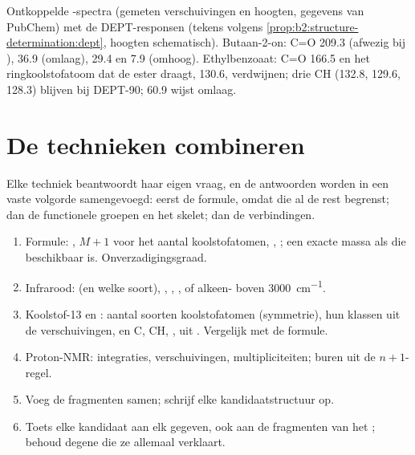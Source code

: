 \begin{omfigure}
{\small Ontkoppelde -spectra (gemeten verschuivingen en hoogten, gegevens van PubChem) met de
DEPT-responsen (tekens volgens \cref{prop:b2:structure-determination:dept}, hoogten schematisch). Butaan-2-on: C=O
209.3 (afwezig bij ),  36.9 (omlaag),  29.4 en 7.9 (omhoog). Ethylbenzoaat: C=O 166.5 en
het ringkoolstofatoom dat de ester draagt, 130.6, verdwijnen; drie  CH (132.8, 129.6, 128.3) blijven bij
DEPT-90;  60.9 wijst omlaag.}
\end{omfigure}

\section{De technieken combineren}

Elke techniek beantwoordt haar eigen vraag, en de antwoorden worden in een vaste volgorde samengevoegd: eerst de formule,
omdat die al de rest begrenst; dan de functionele groepen en het skelet; dan de
verbindingen.

\begin{method}\label{met:b2:structure-determination:solve}
\begin{enumerate}
  \item Formule: , $M+1$ voor het aantal koolstofatomen, , ; een
        exacte massa als die beschikbaar is. Onverzadigingsgraad.
  \item Infrarood:  (en welke soort), , , ,  of alkeen-
        boven \qty{3000}{cm^{-1}}.
  \item Koolstof-13 en : aantal soorten koolstofatomen (symmetrie), hun klassen uit de verschuivingen, en
        C, CH, ,  uit . Vergelijk met de formule.
  \item Proton-NMR: integraties, verschuivingen, multipliciteiten; buren uit de $n + 1$-regel.
  \item Voeg de fragmenten samen; schrijf elke kandidaatstructuur op.
  \item Toets elke kandidaat aan elk gegeven, ook aan de fragmenten van het ; behoud degene
        die ze allemaal verklaart.
\end{enumerate}
\end{method}

